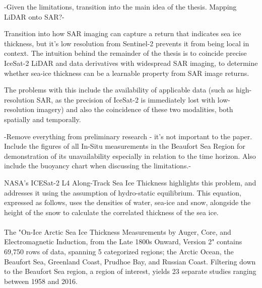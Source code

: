 -Given the limitations, transition into the main idea of the thesis. Mapping LiDAR onto SAR?- 

Transition into how SAR imaging can capture a return that indicates sea ice thickness, but it's low resolution from Sentinel-2 prevents it from being local in context. The intuition behind the remainder of the thesis is to coincide precise IceSat-2 LiDAR and data derivatives with widespread SAR imaging, to determine whether sea-ice thickness can be a learnable property from SAR image returns.

The problems with this include the availability of applicable data (such as high-resolution SAR, as the precision of IceSat-2 is immediately lost with low-resolution imagery) and also the coincidence of these two modalities, both spatially and temporally.

-Remove everything from preliminary research - it's not important to the paper. Include the figures of all In-Situ measurements in the Beaufort Sea Region for demonstration of its unavailability especially in relation to the time horizon. Also include the buoyancy chart when discussing the limitations.-
\par



NASA's ICESat-2 L4 Along-Track Sea Ice Thickness highlights this problem, and addresses it using the assumption of hydro-static equilibrium. This equation, expressed as follows, uses the densities of water, sea-ice and snow, alongside the height of the snow to calculate the correlated thickness of the sea ice.



\paragraph*{}
The "On-Ice Arctic Sea Ice Thickness Measurements by Auger, Core, and Electromagnetic Induction, from the Late 1800s Onward, Version 2" contains 69,750 rows of data, spanning 5 categorized regions; the Arctic Ocean, the Beaufort Sea, Greenland Coast, Prudhoe Bay, and Russian Coast. Filtering down to the Beaufort Sea region, a region of interest, yields 23 separate studies ranging between 1958 and 2016.
\par


